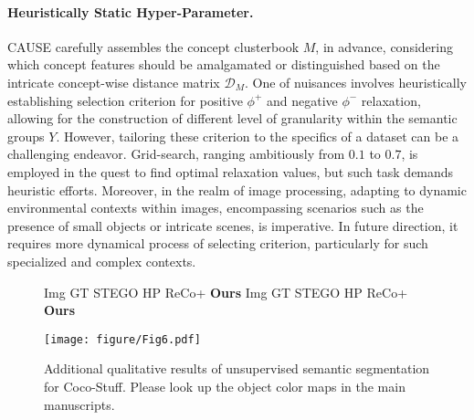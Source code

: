 \documentclass{article} \usepackage{iclr2024_conference,times}
\begin{document}
\paragraph{Heuristically Static Hyper-Parameter.} 
CAUSE carefully assembles the concept clusterbook $M$, in advance, considering which concept features should be amalgamated or distinguished based on the intricate concept-wise distance matrix $\mathcal{D}_{M}$. One of nuisances involves heuristically establishing selection criterion for positive $\phi^+$ and negative $\phi^-$ relaxation, allowing for the construction of different level of granularity within the semantic groups $Y$. However, tailoring these criterion to the specifics of a dataset can be a challenging endeavor. Grid-search, ranging ambitiously from $0.1$ to $0.7$, is employed in the quest to find optimal relaxation values, but such task demands heuristic efforts. Moreover, in the realm of image processing, adapting to dynamic environmental contexts within images, encompassing scenarios such as the presence of small objects or intricate scenes, is imperative. In future direction, it requires more dynamical process of selecting criterion, particularly for such specialized and complex contexts.

\begin{figure*}[b]
\centering
\begin{flushleft}
    \hspace{0.3cm} Img \hspace{0.4cm} GT \hspace{0.17cm} STEGO   \hspace{0.18cm} HP
    \hspace{0.23cm} ReCo+
    \hspace{0.07cm} \textbf{Ours}
    \hspace{0.5cm} Img \hspace{0.4cm} GT \hspace{0.17cm} STEGO   \hspace{0.18cm} HP
    \hspace{0.23cm} ReCo+
    \hspace{0.07cm} \textbf{Ours}
\end{flushleft}	
\vspace*{-0.2cm}
\texttt{[image: figure/Fig6.pdf]}
\caption{Additional qualitative results of unsupervised semantic segmentation for Coco-Stuff. Please look up the object color maps in the main manuscripts.} 
\label{fig:a_coco}

\end{figure*}
\end{document}
